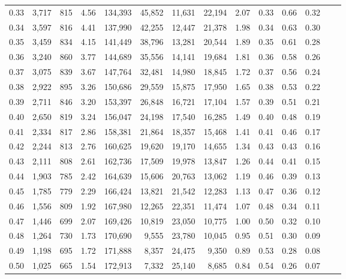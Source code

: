 \begin{tabular}{rrrrrrrrrrrrrr}
0.33 &  3,717 &  815 &    4.56 &  134,393 &   45,852 &  11,631 &  22,194 &  2.07 &  0.33 &  0.66 &      0.32 \\
0.34 &  3,597 &  816 &    4.41 &  137,990 &   42,255 &  12,447 &  21,378 &  1.98 &  0.34 &  0.63 &      0.30 \\
0.35 &  3,459 &  834 &    4.15 &  141,449 &   38,796 &  13,281 &  20,544 &  1.89 &  0.35 &  0.61 &      0.28 \\
0.36 &  3,240 &  860 &    3.77 &  144,689 &   35,556 &  14,141 &  19,684 &  1.81 &  0.36 &  0.58 &      0.26 \\
0.37 &  3,075 &  839 &    3.67 &  147,764 &   32,481 &  14,980 &  18,845 &  1.72 &  0.37 &  0.56 &      0.24 \\
0.38 &  2,922 &  895 &    3.26 &  150,686 &   29,559 &  15,875 &  17,950 &  1.65 &  0.38 &  0.53 &      0.22 \\
0.39 &  2,711 &  846 &    3.20 &  153,397 &   26,848 &  16,721 &  17,104 &  1.57 &  0.39 &  0.51 &      0.21 \\
0.40 &  2,650 &  819 &    3.24 &  156,047 &   24,198 &  17,540 &  16,285 &  1.49 &  0.40 &  0.48 &      0.19 \\
0.41 &  2,334 &  817 &    2.86 &  158,381 &   21,864 &  18,357 &  15,468 &  1.41 &  0.41 &  0.46 &      0.17 \\
0.42 &  2,244 &  813 &    2.76 &  160,625 &   19,620 &  19,170 &  14,655 &  1.34 &  0.43 &  0.43 &      0.16 \\
0.43 &  2,111 &  808 &    2.61 &  162,736 &   17,509 &  19,978 &  13,847 &  1.26 &  0.44 &  0.41 &      0.15 \\
0.44 &  1,903 &  785 &    2.42 &  164,639 &   15,606 &  20,763 &  13,062 &  1.19 &  0.46 &  0.39 &      0.13 \\
0.45 &  1,785 &  779 &    2.29 &  166,424 &   13,821 &  21,542 &  12,283 &  1.13 &  0.47 &  0.36 &      0.12 \\
0.46 &  1,556 &  809 &    1.92 &  167,980 &   12,265 &  22,351 &  11,474 &  1.07 &  0.48 &  0.34 &      0.11 \\
0.47 &  1,446 &  699 &    2.07 &  169,426 &   10,819 &  23,050 &  10,775 &  1.00 &  0.50 &  0.32 &      0.10 \\
0.48 &  1,264 &  730 &    1.73 &  170,690 &    9,555 &  23,780 &  10,045 &  0.95 &  0.51 &  0.30 &      0.09 \\
0.49 &  1,198 &  695 &    1.72 &  171,888 &    8,357 &  24,475 &   9,350 &  0.89 &  0.53 &  0.28 &      0.08 \\
0.50 &  1,025 &  665 &    1.54 &  172,913 &    7,332 &  25,140 &   8,685 &  0.84 &  0.54 &  0.26 &      0.07 \\

\end{tabular}
